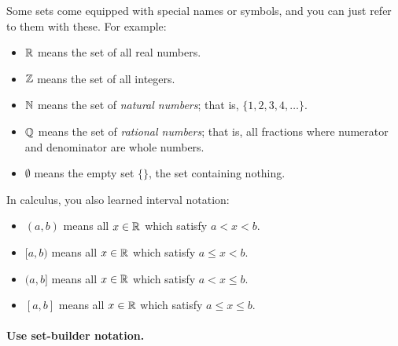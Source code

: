 \documentclass{tufte-book}
\begin{document}
Some sets come equipped with special names or symbols, and you can just refer to them with these. For example:
\begin{itemize}
    \item $\mathbb{R}$ means the set of all real numbers.
    \item $\mathbb{Z}$ means the set of all integers.
    \item $\mathbb{N}$ means the set of \emph{natural numbers}; that is, $\{1, 2, 3, 4, \dots\}$.
    \item $\mathbb{Q}$ means the set of \emph{rational numbers}; that is, all fractions where numerator and denominator are whole numbers.
    \item $\emptyset$ means the empty set $\{\}$, the set containing nothing.
\end{itemize}
In calculus, you also learned interval notation:
\begin{itemize}
    \item $(a,b)$ means all $x \in \mathbb{R}$ which satisfy $a < x < b$.
    \item $[a,b)$ means all $x \in \mathbb{R}$ which satisfy $a \leq x < b$.
    \item $(a,b]$ means all $x \in \mathbb{R}$ which satisfy $a < x \leq b$.
    \item $[a,b]$ means all $x \in \mathbb{R}$ which satisfy $a \leq x \leq b$.
\end{itemize}


\paragraph{Use set-builder notation.}
\label{sec:use-set-builder}
\end{document}
